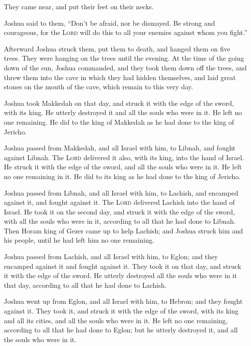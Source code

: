 They came near, and put their feet on their necks.

 Joshua said to them, ``Don't be afraid, nor be dismayed.
Be strong and courageous, for the \textsc{Lord} will do this to all your
enemies against whom you fight.''

 Afterward Joshua struck them, put them to death, and
hanged them on five trees. They were hanging on the trees until the
evening.  At the time of the going down of the sun,
Joshua commanded, and they took them down off the trees, and threw them
into the cave in which they had hidden themselves, and laid great stones
on the mouth of the cave, which remain to this very day.

 Joshua took Makkedah on that day, and struck it with the
edge of the sword, with its king. He utterly destroyed it and all the
souls who were in it. He left no one remaining. He did to the king of
Makkedah as he had done to the king of Jericho.

 Joshua passed from Makkedah, and all Israel with him, to
Libnah, and fought against Libnah.  The \textsc{Lord}
delivered it also, with its king, into the hand of Israel. He struck it
with the edge of the sword, and all the souls who were in it. He left no
one remaining in it. He did to its king as he had done to the king of
Jericho.

 Joshua passed from Libnah, and all Israel with him, to
Lachish, and encamped against it, and fought against it. 
The \textsc{Lord} delivered Lachish into the hand of Israel. He took it
on the second day, and struck it with the edge of the sword, with all
the souls who were in it, according to all that he had done to Libnah.
 Then Horam king of Gezer came up to help Lachish; and
Joshua struck him and his people, until he had left him no one
remaining.

 Joshua passed from Lachish, and all Israel with him, to
Eglon; and they encamped against it and fought against it.
 They took it on that day, and struck it with the edge of
the sword. He utterly destroyed all the souls who were in it that day,
according to all that he had done to Lachish.

 Joshua went up from Eglon, and all Israel with him, to
Hebron; and they fought against it.  They took it, and
struck it with the edge of the sword, with its king and all its cities,
and all the souls who were in it. He left no one remaining, according to
all that he had done to Eglon; but he utterly destroyed it, and all the
souls who were in it.


